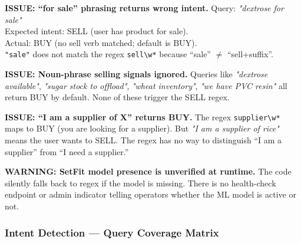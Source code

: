 \documentclass[12pt,a4paper]{article}
\begin{document}
\begin{issueBox}
\textbf{ISSUE: ``for sale'' phrasing returns wrong intent.}
Query: \textit{"dextrose for sale"} \\
Expected intent: SELL (user has product for sale). \\
Actual: BUY (no sell verb matched; default is BUY). \\
\texttt{"sale"} does not match the regex \texttt{sell\textbackslash w*} because ``sale'' $\neq$ ``sell+suffix''.
\end{issueBox}

\begin{issueBox}
\textbf{ISSUE: Noun-phrase selling signals ignored.}
Queries like \textit{"dextrose available"}, \textit{"sugar stock to offload"},
\textit{"wheat inventory"}, \textit{"we have PVC resin"} all return BUY by default.
None of these trigger the SELL regex.
\end{issueBox}

\begin{issueBox}
\textbf{ISSUE: ``I am a supplier of X'' returns BUY.}
The regex \texttt{supplier\textbackslash w*} maps to BUY (you are looking for a supplier).
But \textit{"I am a supplier of rice"} means the user wants to SELL. The regex has no
way to distinguish ``I am a supplier'' from ``I need a supplier.''
\end{issueBox}

\begin{warnBox}
\textbf{WARNING: SetFit model presence is unverified at runtime.}
The code silently falls back to regex if the model is missing. There is no health-check
endpoint or admin indicator telling operators whether the ML model is active or not.
\end{warnBox}

\subsubsection{Intent Detection --- Query Coverage Matrix}
\end{document}
